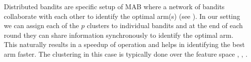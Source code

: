 Distributed bandits are specific setup of MAB where a network of bandits collaborate with each other to identify the optimal arm(s) (see \citet{awerbuch2008competitive,liu2010distributed,szorenyi2013gossip,hillel2013distributed}). In our setting we can assign each of the $p$ clusters to individual bandits and at the end of each round they can share information synchronously to identify the optimal arm. This naturally results in a speedup of operation and helps in identifying the best arm faster. The clustering in this case is typically done over the feature space \citet{bui2012clustered}, \citet{cesa2013gang}, \citet{gentile2014online}.